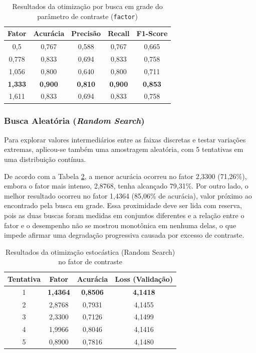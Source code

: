 \documentclass[conference]{IEEEtran}
\begin{document}
\begin{table}[H]
    \centering
    \caption{Resultados da otimização por busca em grade do parâmetro de contraste (\texttt{factor})}
    \label{tab:resultados_grid_search}
    \vspace{0.1cm}
    \begin{tabular}{ccccc}
        \hline
        \textbf{Fator} & \textbf{Acurácia} & \textbf{Precisão} & \textbf{Recall} & \textbf{F1-Score} \\
        \hline
        0,5     & 0,767    & 0,588    & 0,767  & 0,665 \\
        0,778   & 0,833    & 0,694    & 0,833  & 0,758 \\
        1,056   & 0,800    & 0,640    & 0,800  & 0,711 \\
        \textbf{1,333}   & \textbf{0,900}    & \textbf{0,810}    & \textbf{0,900}  & \textbf{0,853} \\
        1,611   & 0,833    & 0,694    & 0,833  & 0,758 \\
        \hline
    \end{tabular}
\end{table}

\subsubsection{Busca Aleatória (\textit{Random Search})}

Para explorar valores intermediários entre as faixas discretas e testar variações extremas, aplicou-se também uma amostragem aleatória, com 5 tentativas em uma distribuição contínua.

De acordo com a Tabela \ref{tab:resultados_random_search}, a menor acurácia ocorreu no fator 2,3300 (71,26\%), embora o fator mais intenso, 2,8768, tenha alcançado 79,31\%. Por outro lado, o melhor resultado ocorreu no fator 1,4364 (85,06\% de acurácia), valor próximo ao encontrado pela busca em grade. Essa proximidade deve ser lida com reserva, pois as duas buscas foram medidas em conjuntos diferentes e a relação entre o fator e o desempenho não se mostrou monotônica em nenhuma delas, o que impede afirmar uma degradação progressiva causada por excesso de contraste.

\begin{table}[H]
    \centering
    \caption{Resultados da otimização estocástica (Random Search) no fator de contraste}
    \label{tab:resultados_random_search}
    \vspace{0.1cm}
    \begin{tabular}{cccc}
        \hline
        \textbf{Tentativa} & \textbf{Fator} & \textbf{Acurácia} & \textbf{Loss (Validação)} \\
        \hline
        1 & \textbf{1,4364} & \textbf{0,8506} & \textbf{4,1418} \\
        2 & 2,8768 & 0,7931 & 4,1455 \\
        3 & 2,3300 & 0,7126 & 4,1499 \\
        4 & 1,9966 & 0,8046 & 4,1416 \\
        5 & 0,8900 & 0,7816 & 4,1480 \\
        \hline
    \end{tabular}
\end{table}
\end{document}

